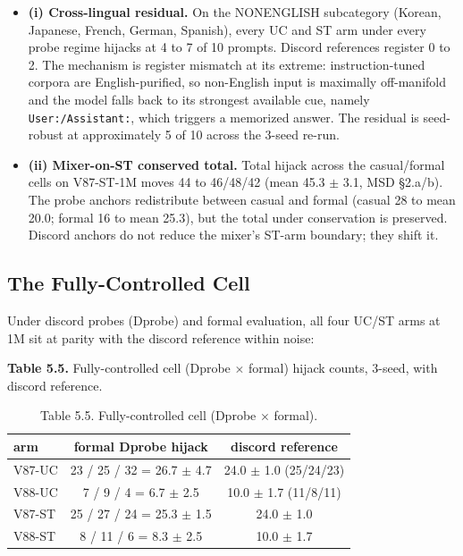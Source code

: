 \documentclass[11pt]{article}
\begin{document}
\begin{itemize}
  \item \textbf{(i) Cross-lingual residual.} On the NONENGLISH subcategory (Korean, Japanese, French, German, Spanish), every UC and ST arm under every probe regime hijacks at 4 to 7 of 10 prompts. Discord references register 0 to 2. The mechanism is register mismatch at its extreme: instruction-tuned corpora are English-purified, so non-English input is maximally off-manifold and the model falls back to its strongest available cue, namely \texttt{User:/Assistant:}, which triggers a memorized answer. The residual is seed-robust at approximately 5 of 10 across the 3-seed re-run.
  \item \textbf{(ii) Mixer-on-ST conserved total.} Total hijack across the casual/formal cells on V87-ST-1M moves 44 to 46/48/42 (mean 45.3 $\pm$ 3.1, MSD \S2.a/b). The probe anchors redistribute between casual and formal (casual 28 to mean 20.0; formal 16 to mean 25.3), but the total under conservation is preserved. Discord anchors do not reduce the mixer's ST-arm boundary; they shift it.
\end{itemize}

\subsection{The Fully-Controlled Cell}

Under discord probes (Dprobe) and formal evaluation, all four UC/ST arms at 1M sit at parity with the discord reference within noise:

\textbf{Table 5.5.} Fully-controlled cell (Dprobe $\times$ formal) hijack counts, 3-seed, with discord reference.

\begin{table}[!t]
\centering
\small
\caption*{Table 5.5. Fully-controlled cell (Dprobe $\times$ formal).}
\begin{tabular}{lcc}
\toprule
arm & formal Dprobe hijack & discord reference \\
\midrule
V87-UC & 23 / 25 / 32 = 26.7 $\pm$ 4.7 & 24.0 $\pm$ 1.0 (25/24/23) \\
V88-UC & 7 / 9 / 4 = 6.7 $\pm$ 2.5 & 10.0 $\pm$ 1.7 (11/8/11) \\
V87-ST & 25 / 27 / 24 = 25.3 $\pm$ 1.5 & 24.0 $\pm$ 1.0 \\
V88-ST & 8 / 11 / 6 = 8.3 $\pm$ 2.5 & 10.0 $\pm$ 1.7 \\
\bottomrule
\end{tabular}
\end{table}
\end{document}
